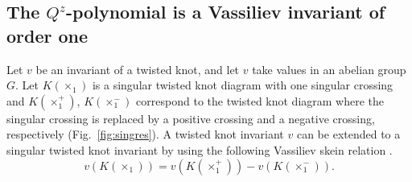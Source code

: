 \documentclass[10pt,a4paper,reqno]{amsart}
\theoremstyle{definition}
\theoremstyle{remark}
\begin{document}
\subsection{The \texorpdfstring{$Q^{z}$}{Qz}-polynomial is a Vassiliev invariant of order one}
	Let $v$ be an invariant of a twisted knot, and let $v$ take values in an abelian group $G$. Let $K(\times_{1})$ is a singular twisted knot diagram with one singular crossing and $K(\times_{1}^{+})$, $K(\times_{1}^{-})$ correspond to the twisted knot diagram where the singular crossing is replaced by a positive crossing and a negative crossing, respectively (Fig.~\ref{fig:singres}). A twisted knot invariant $v$ can be extended to a singular twisted knot invariant by using the following Vassiliev skein relation \cite{Vass}. $$v(K(\times_{1}))= v(K(\times_{1}^{+}))-v(K(\times_{1}^{-})).$$
\end{document}
